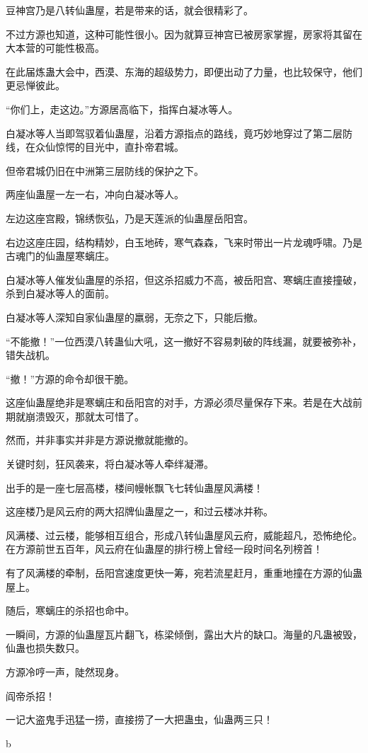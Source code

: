 \begin{this_body}
豆神宫乃是八转仙蛊屋，若是带来的话，就会很精彩了。

不过方源也知道，这种可能性很小。因为就算豆神宫已被房家掌握，房家将其留在大本营的可能性极高。

在此届炼蛊大会中，西漠、东海的超级势力，即便出动了力量，也比较保守，他们更忌惮彼此。

“你们上，走这边。”方源居高临下，指挥白凝冰等人。

白凝冰等人当即驾驭着仙蛊屋，沿着方源指点的路线，竟巧妙地穿过了第二层防线，在众仙惊愕的目光中，直扑帝君城。

但帝君城仍旧在中洲第三层防线的保护之下。

两座仙蛊屋一左一右，冲向白凝冰等人。

左边这座宫殿，锦绣恢弘，乃是天莲派的仙蛊屋岳阳宫。

右边这座庄园，结构精妙，白玉地砖，寒气森森，飞来时带出一片龙魂呼啸。乃是古魂门的仙蛊屋寒螭庄。

白凝冰等人催发仙蛊屋的杀招，但这杀招威力不高，被岳阳宫、寒螭庄直接撞破，杀到白凝冰等人的面前。

白凝冰等人深知自家仙蛊屋的羸弱，无奈之下，只能后撤。

“不能撤！”一位西漠八转蛊仙大吼，这一撤好不容易刺破的阵线漏，就要被弥补，错失战机。

“撤！”方源的命令却很干脆。

这座仙蛊屋绝非是寒螭庄和岳阳宫的对手，方源必须尽量保存下来。若是在大战前期就崩溃毁灭，那就太可惜了。

然而，并非事实并非是方源说撤就能撤的。

关键时刻，狂风袭来，将白凝冰等人牵绊凝滞。

出手的是一座七层高楼，楼间幔帐飘飞七转仙蛊屋风满楼！

这座楼乃是风云府的两大招牌仙蛊屋之一，和过云楼冰并称。

风满楼、过云楼，能够相互组合，形成八转仙蛊屋风云府，威能超凡，恐怖绝伦。在方源前世五百年，风云府在仙蛊屋的排行榜上曾经一段时间名列榜首！

有了风满楼的牵制，岳阳宫速度更快一筹，宛若流星赶月，重重地撞在方源的仙蛊屋上。

随后，寒螭庄的杀招也命中。

一瞬间，方源的仙蛊屋瓦片翻飞，栋梁倾倒，露出大片的缺口。海量的凡蛊被毁，仙蛊也损失数只。

方源冷哼一声，陡然现身。

阎帝杀招！

一记大盗鬼手迅猛一捞，直接捞了一大把蛊虫，仙蛊两三只！

b

\end{this_body}

